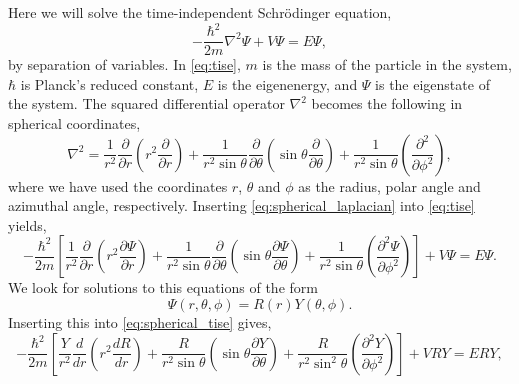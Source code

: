 Here we will solve the time-independent Schrödinger equation,
\begin{equation}
    \label{eq:tise}
    -\frac{\hbar^2}{2m}\nabla^2\Psi + V\Psi = E\Psi,
\end{equation}
by separation of variables. In \autoref{eq:tise}, $m$ is the mass of the 
particle in the system, $\hbar$ is Planck's reduced constant, $E$ is the eigenenergy,
and $\Psi$ is the eigenstate of the system. The squared differential operator $\nabla^2$
becomes the following in spherical coordinates,
\begin{equation}
    \label{eq:spherical_laplacian}
    \nabla^2 = 
        \frac{1}{r^2} \frac{\partial}{\partial r} 
            \left(r^2 \frac{\partial}{\partial r}\right)
        + 
        \frac{1}{r^2\sin\theta} \frac{\partial}{\partial \theta}
            \left(\sin\theta \frac{\partial}{\partial \theta} \right)
        +
        \frac{1}{r^2\sin\theta}
            \left(\frac{\partial^2}{\partial\phi^2}\right),
\end{equation}
where we have used the coordinates $r$, $\theta$ and $\phi$ as the radius,
polar angle and azimuthal angle, respectively. Inserting
\autoref{eq:spherical_laplacian} into \autoref{eq:tise} yields,
\begin{equation}
    \label{eq:spherical_tise}
    -\frac{\hbar^2}{2m}
    \left[
        \frac{1}{r^2}\frac{\partial}{\partial r} 
            \left(r^2 \frac{\partial \Psi}{\partial r} \right)
        +
        \frac{1}{r^2\sin\theta} \frac{\partial}{\partial\theta}
            \left(\sin\theta \frac{\partial \Psi}{\partial \theta} \right)
        +
        \frac{1}{r^2\sin\theta}
            \left(\frac{\partial^2 \Psi}{\partial \phi^2} \right)
    \right]
    +
    V \Psi
    =
    E \Psi.
\end{equation}
We look for solutions to this equations of the form 
\begin{equation}
    \Psi(r,\theta,\phi) = R(r) Y(\theta, \phi).
\end{equation}
Inserting this into \autoref{eq:spherical_tise} gives,
\begin{equation}
   -\frac{\hbar^2}{2m}
   \left[
        \frac{Y}{r^2} \frac{d}{dr}
            \left(r^2\frac{dR}{dr} \right)
        +
        \frac{R}{r^2\sin\theta}
            \left(\sin\theta \frac{\partial Y}{\partial\theta} \right)
        +
        \frac{R}{r^2\sin^2\theta}
            \left(\frac{\partial^2Y}{\partial\phi^2} \right)
   \right] 
    +
    VRY
    =
    ERY,
\end{equation}

